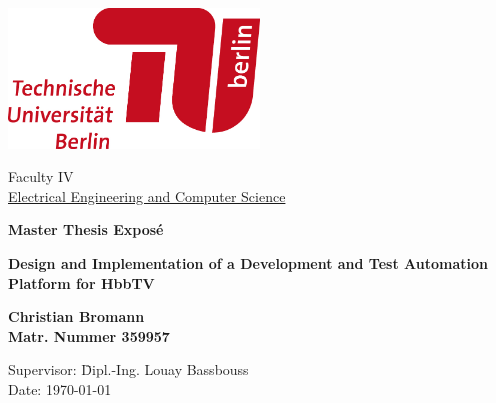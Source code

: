%
%

\thispagestyle{empty}

\begin{center}

\includegraphics[width=0.5\textwidth]{./images/tu-logo.jpg}

\vspace{1.5cm}

Faculty IV\\
\href{http://www.eecs.tu-berlin.de/menue/fakultaet_iv}{Electrical Engineering and Computer Science}

\vspace{3cm}

{\Large \textbf{Master Thesis Exposé}}\\

\vspace{1cm}

{\Huge \textbf{Design and Implementation of a Development and Test Automation Platform for HbbTV}}\\

\vspace{3cm}

{\Large \textbf{Christian Bromann}}\\
\textbf{Matr. Nummer 359957}

\vspace{1.5cm}

\parbox{1cm}{
\begin{large}
\begin{tabbing}
Supervisor: \hspace{0.5cm}\=Dipl.-Ing. Louay Bassbouss\\
Date: \> \today
\end{tabbing}
\end{large}}

\end{center}
